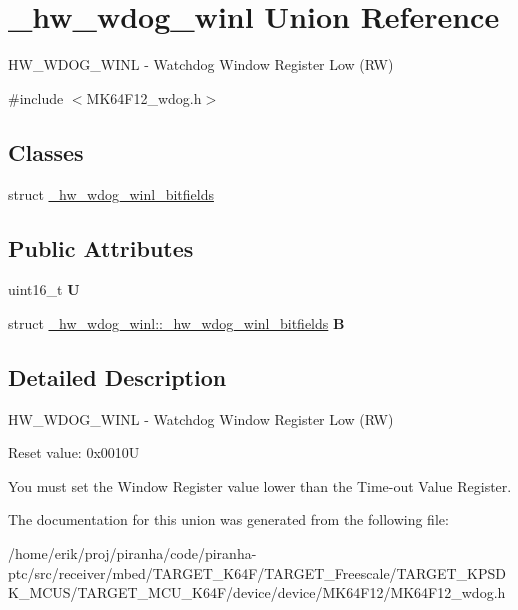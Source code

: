 \hypertarget{union__hw__wdog__winl}{}\section{\+\_\+hw\+\_\+wdog\+\_\+winl Union Reference}
\label{union__hw__wdog__winl}


H\+W\+\_\+\+W\+D\+O\+G\+\_\+\+W\+I\+NL -\/ Watchdog Window Register Low (RW)  




{\ttfamily \#include $<$M\+K64\+F12\+\_\+wdog.\+h$>$}

\subsection*{Classes}
\begin{DoxyCompactItemize}
\item 
struct \hyperlink{struct__hw__wdog__winl_1_1__hw__wdog__winl__bitfields}{\+\_\+hw\+\_\+wdog\+\_\+winl\+\_\+bitfields}
\end{DoxyCompactItemize}
\subsection*{Public Attributes}
\begin{DoxyCompactItemize}
\item 
uint16\+\_\+t {\bfseries U}\hypertarget{union__hw__wdog__winl_a0e1c9bc2e186bbbc4828995e08513235}{}\label{union__hw__wdog__winl_a0e1c9bc2e186bbbc4828995e08513235}

\item 
struct \hyperlink{struct__hw__wdog__winl_1_1__hw__wdog__winl__bitfields}{\+\_\+hw\+\_\+wdog\+\_\+winl\+::\+\_\+hw\+\_\+wdog\+\_\+winl\+\_\+bitfields} {\bfseries B}\hypertarget{union__hw__wdog__winl_aeaeb8e8b14bd6a5fb8ddac087e38ffbf}{}\label{union__hw__wdog__winl_aeaeb8e8b14bd6a5fb8ddac087e38ffbf}

\end{DoxyCompactItemize}


\subsection{Detailed Description}
H\+W\+\_\+\+W\+D\+O\+G\+\_\+\+W\+I\+NL -\/ Watchdog Window Register Low (RW) 

Reset value\+: 0x0010U

You must set the Window Register value lower than the Time-\/out Value Register. 

The documentation for this union was generated from the following file\+:\begin{DoxyCompactItemize}
\item 
/home/erik/proj/piranha/code/piranha-\/ptc/src/receiver/mbed/\+T\+A\+R\+G\+E\+T\+\_\+\+K64\+F/\+T\+A\+R\+G\+E\+T\+\_\+\+Freescale/\+T\+A\+R\+G\+E\+T\+\_\+\+K\+P\+S\+D\+K\+\_\+\+M\+C\+U\+S/\+T\+A\+R\+G\+E\+T\+\_\+\+M\+C\+U\+\_\+\+K64\+F/device/device/\+M\+K64\+F12/M\+K64\+F12\+\_\+wdog.\+h\end{DoxyCompactItemize}
